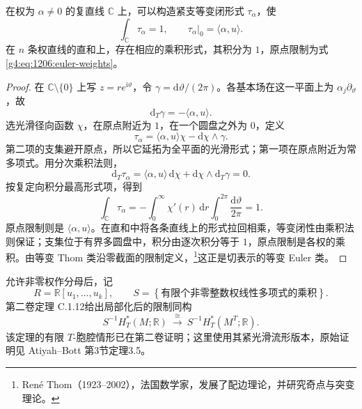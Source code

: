 \begin{lemma}\label{g4:lem:1206:equivariant-thom-point}
	在权为 \(\alpha\ne0\) 的复直线 \(\mathbb C\) 上，可以构造紧支等变闭形式 \(\tau_\alpha\)，使
	\[
		\int_{\mathbb C}\tau_\alpha=1,\qquad
		\tau_\alpha|_0=\langle\alpha,u\rangle.
	\]
	在 \(n\) 条权直线的直和上，存在相应的乘积形式，其积分为 \(1\)，原点限制为式\eqref{g4:eq:1206:euler-weights}。
\end{lemma}
\begin{proof}
	在 \(\mathbb C\setminus\{0\}\) 上写 \(z=re^{\mathrm{i}\vartheta}\)，令 \(\gamma=\mathrm{d}\vartheta/(2\pi)\)。各基本场在这一平面上为 \(\alpha_j\partial_\vartheta\)，故
	\[
		\mathrm{d}_T\gamma=-\langle\alpha,u\rangle.
	\]
	选光滑径向函数 \(\chi\)，在原点附近为 \(1\)，在一个圆盘之外为 \(0\)，定义
	\[
		\tau_\alpha
		=\langle\alpha,u\rangle\chi-\mathrm{d}\chi\wedge\gamma.
	\]
	第二项的支集避开原点，所以它延拓为全平面的光滑形式；第一项在原点附近为常多项式。用分次乘积法则，
	\[
		\mathrm{d}_T\tau_\alpha
		=\langle\alpha,u\rangle\,\mathrm{d}\chi
		+\mathrm{d}\chi\wedge\mathrm{d}_T\gamma=0.
	\]
	按复定向积分最高形式项，得到
	\[
		\int_{\mathbb C}\tau_\alpha
		=-\int_0^\infty\chi'(r)\,\mathrm{d}r
		\int_0^{2\pi}\frac{\mathrm{d}\vartheta}{2\pi}=1.
	\]
	原点限制则是 \(\langle\alpha,u\rangle\)。在直和中将各条直线上的形式拉回相乘，等变闭性由乘积法则保证；支集位于有界多圆盘中，积分由逐次积分等于 \(1\)，原点限制是各权的乘积。由等变 Thom 类沿零截面的限制定义，\footnote{René Thom（1923--2002），法国数学家，发展了配边理论，并研究奇点与突变理论。}这正是切表示的等变 Euler 类。
\end{proof}

允许非零权作分母后，记
\[
	R=\mathbb R[u_1,\ldots,u_k],\qquad
	S=\left\{\text{有限个非零整数权线性多项式的乘积}\right\}.
\]
第二卷定理 C.1.12给出局部化后的限制同构
\begin{equation}\label{g4:eq:1206:localized-restriction}
	S^{-1}H_T^*(M;\mathbb R)
	\ \xrightarrow{\ \cong\ }\ 
	S^{-1}H_T^*(M^T;\mathbb R).
\end{equation}
该定理的有限 \(T\)-胞腔情形已在第二卷证明；这里使用其紧光滑流形版本，原始证明见 Atiyah--Bott 第3节定理3.5。\cite[第8页，定理3.5]{AtiyahBott1984MomentMap}

